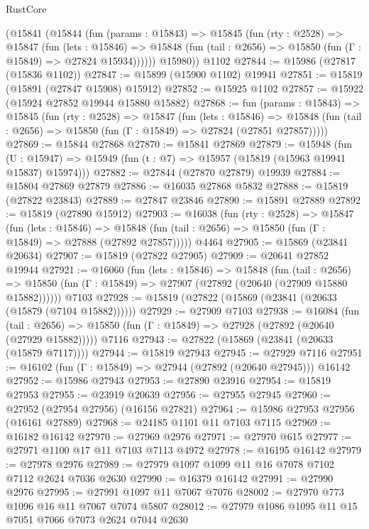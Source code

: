 \begin{lexlean}{RustCore}
\begin{coremodule}
      (@15841
        (@15844
          (fun (params : @15843) =>
          @15845
            (fun (rty : @2528) =>
            @15847
              (fun (lets : @15846) =>
              @15848 (fun (tail : @2656) => @15850 (fun (Γ : @15849) => @27824 @15934))))))
        @15980))
    @1102
@27844 := @15986 (@27817 (@15836 @1102))
@27847 := @15899 (@15900 @1102) @19941
@27851 := @15819 (@15891 (@27847 @15908) @15912)
@27852 := @15925 @1102
@27857 := @15922 (@15924 @27852 @19944 @15880 @15882)
@27868 := fun (params : @15843) =>
  @15845
    (fun (rty : @2528) =>
    @15847
      (fun (lets : @15846) =>
      @15848 (fun (tail : @2656) => @15850 (fun (Γ : @15849) => @27824 (@27851 @27857)))))
@27869 := @15844 @27868
@27870 := @15841 @27869
@27879 := @15948
    (fun (U : @15947) => @15949 (fun (t : @7) => @15957 (@15819 (@15963 @19941 @15837) @15974)))
@27882 := @27844 (@27870 @27879) @19939
@27884 := @15804 @27869 @27879
@27886 := @16035 @27868 @5832
@27888 := @15819 (@27822 @23843)
@27889 := @27847 @23846
@27890 := @15891 @27889
@27892 := @15819 (@27890 @15912)
@27903 := @16038
    (fun (rty : @2528) =>
    @15847
      (fun (lets : @15846) =>
      @15848 (fun (tail : @2656) => @15850 (fun (Γ : @15849) => @27888 (@27892 @27857)))))
    @4464
@27905 := @15869 (@23841 @20634)
@27907 := @15819 (@27822 @27905)
@27909 := @20641 @27852 @19944
@27921 := @16060
    (fun (lets : @15846) =>
    @15848
      (fun (tail : @2656) =>
      @15850 (fun (Γ : @15849) => @27907 (@27892 (@20640 (@27909 @15880 @15882))))))
    @7103
@27928 := @15819 (@27822 (@15869 (@23841 (@20633 (@15879 (@7104 @15882))))))
@27929 := @27909 @7103
@27938 := @16084
    (fun (tail : @2656) => @15850 (fun (Γ : @15849) => @27928 (@27892 (@20640 (@27929 @15882)))))
    @7116
@27943 := @27822 (@15869 (@23841 (@20633 (@15879 @7117))))
@27944 := @15819 @27943
@27945 := @27929 @7116
@27951 := @16102 (fun (Γ : @15849) => @27944 (@27892 (@20640 @27945))) @16142
@27952 := @15986 @27943
@27953 := @27890 @23916
@27954 := @15819 @27953
@27955 := @23919 @20639
@27956 := @27955 @27945
@27960 := @27952 (@27954 @27956) (@16156 @27821)
@27964 := @15986 @27953 @27956 (@16161 @27889)
@27968 := @24185 @1101 @11 @7103 @7115
@27969 := @16182 @16142
@27970 := @27969 @2976
@27971 := @27970 @615
@27977 := @27971 @1100 @17 @11 @7103 @7113 @4972
@27978 := @16195 @16142
@27979 := @27978 @2976
@27989 := @27979 @1097 @1099 @11 @16 @7078 @7102 @7112 @2624 @7036 @2630
@27990 := @16379 @16142
@27991 := @27990 @2976
@27995 := @27991 @1097 @11 @7067 @7076
@28002 := @27970 @773 @1096 @16 @11 @7067 @7074 @5807
@28012 := @27979 @1086 @1095 @11 @15 @7051 @7066 @7073 @2624 @7044 @2630

\end{coremodule}
\end{lexlean}
